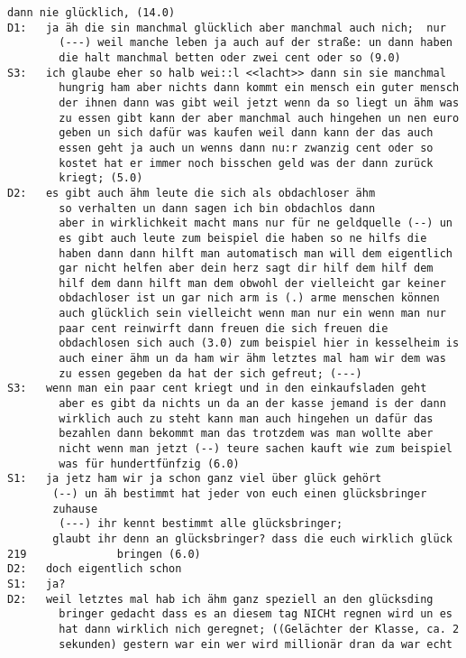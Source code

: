 \begin{lstlisting}[language={}]
        dann nie glücklich, (14.0)
D1:   ja äh die sin manchmal glücklich aber manchmal auch nich;  nur 
        (---) weil manche leben ja auch auf der straße: un dann haben 
        die halt manchmal betten oder zwei cent oder so (9.0)
S3:   ich glaube eher so halb wei::l <<lacht>> dann sin sie manchmal 
        hungrig ham aber nichts dann kommt ein mensch ein guter mensch 
        der ihnen dann was gibt weil jetzt wenn da so liegt un ähm was 
        zu essen gibt kann der aber manchmal auch hingehen un nen euro 
        geben un sich dafür was kaufen weil dann kann der das auch 
        essen geht ja auch un wenns dann nu:r zwanzig cent oder so  
        kostet hat er immer noch bisschen geld was der dann zurück  
        kriegt; (5.0)
D2:   es gibt auch ähm leute die sich als obdachloser ähm 
        so verhalten un dann sagen ich bin obdachlos dann
        aber in wirklichkeit macht mans nur für ne geldquelle (--) un 
        es gibt auch leute zum beispiel die haben so ne hilfs die 
        haben dann dann hilft man automatisch man will dem eigentlich 
        gar nicht helfen aber dein herz sagt dir hilf dem hilf dem 
        hilf dem dann hilft man dem obwohl der vielleicht gar keiner 
        obdachloser ist un gar nich arm is (.) arme menschen können 
        auch glücklich sein vielleicht wenn man nur ein wenn man nur 
        paar cent reinwirft dann freuen die sich freuen die 
        obdachlosen sich auch (3.0) zum beispiel hier in kesselheim is 
        auch einer ähm un da ham wir ähm letztes mal ham wir dem was 
        zu essen gegeben da hat der sich gefreut; (---)
S3:   wenn man ein paar cent kriegt und in den einkaufsladen geht 
        aber es gibt da nichts un da an der kasse jemand is der dann 
        wirklich auch zu steht kann man auch hingehen un dafür das 
        bezahlen dann bekommt man das trotzdem was man wollte aber 
        nicht wenn man jetzt (--) teure sachen kauft wie zum beispiel 
        was für hundertfünfzig (6.0)
S1:   ja jetz ham wir ja schon ganz viel über glück gehört 
       (--) un äh bestimmt hat jeder von euch einen glücksbringer      
       zuhause 
        (---) ihr kennt bestimmt alle glücksbringer; 
       glaubt ihr denn an glücksbringer? dass die euch wirklich glück 219              bringen (6.0)
D2:   doch eigentlich schon
S1:   ja?
D2:   weil letztes mal hab ich ähm ganz speziell an den glücksding  
        bringer gedacht dass es an diesem tag NICHt regnen wird un es 
        hat dann wirklich nich geregnet; ((Gelächter der Klasse, ca. 2 
        sekunden) gestern war ein wer wird millionär dran da war echt 

\end{lstlisting}
